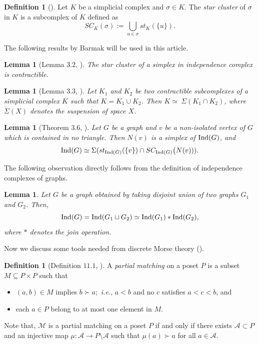 \documentclass[12pt]{article}
\newtheorem{lem}[thm]{Lemma}
\numberwithin{thm}{section}
\theoremstyle{definition}
\newtheorem{defn}[thm]{Definition}
\newcommand{\A}{\mathcal{A}}
\newcommand{\M}{\mathcal{M}}
\newcommand{\ind}{{\rm{Ind}}}
\begin{document}
	
  	\begin{defn}[\cite{Bar13}]
Let $K$ be a simplicial complex and $\sigma \in K$. The {\it star cluster} of $\sigma$ in $K$ is a subcomplex of $K$ defined as $$SC_K(\sigma):=\bigcup\limits_{u \in \sigma}st_K(\{u\}).$$
\end{defn}

The following results by Barmak will be used in this article.

\begin{lem}[Lemma $3.2$, \cite{Bar13}]\label{lem2.2}
The star cluster of a simplex in independence complex is contractible.
\end{lem}

\begin{lem}[Lemma $3.3$, \cite{Bar13}]\label{lem:suspension}
Let $K_1$ and $K_2$ be two contractible subcomplexes  of a simplicial complex $K$ such that $K=K_1 \cup K_2$. Then $K \simeq \ \Sigma(K_1 \cap K_2)$, where $\Sigma(X)$ denotes the suspension of space $X$.
\end{lem}

\begin{lem}[Theorem $3.6$, \cite{Bar13}]\label{lem:cluster}
    Let $G$ be  a graph and $v$ be  a non-isolated vertex of $G$ which is contained in no triangle. Then $N(v)$ is a simplex of $\ind(G)$, and
    $$\ind(G) \simeq \Sigma (st_{\ind(G)}(\{v\}) \cap SC_{\ind(G)}\big(N(v)) ).$$
\end{lem}

 The following  observation directly follows from the definition of independence complexes of graphs.
 
\begin{lem}\label{lem:union}
  Let $G$ be a graph obtained by taking disjoint union of two graphs $G_1$ and $G_2$. Then, $$\ind(G)=\ind(G_1\sqcup G_2) \simeq \ind(G_1) \ast \ind(G_2),$$ where $\ast$ denotes the join operation.
\end{lem}


Now we discuss some tools needed from discrete Morse theory (\cite{f}).

\begin{defn}[Definition $11.1$, \cite{dk}]
A {\it partial matching} on a poset $P$ is a subset $M \subseteq P \times P$ such that
\begin{itemize}
\item[(i)] $(a,b) \in M$ implies $ b \succ a;$ {\it i.e.}, $a < b$ and no $c$ satisfies $ a < c < b $, and
\item[(ii)] each $ a \in P $ belong to at most one element in $M$.
\end{itemize}

\end{defn}
   Note that, $\M$ is a  partial matching on a poset $P$ if and only if 
  there exists  $\A \subset P$ and an injective map $\mu: \A
 \rightarrow P\setminus \A$ such that $\mu(a)\succ a$ for all $a \in \A$. 
 
\end{document}
